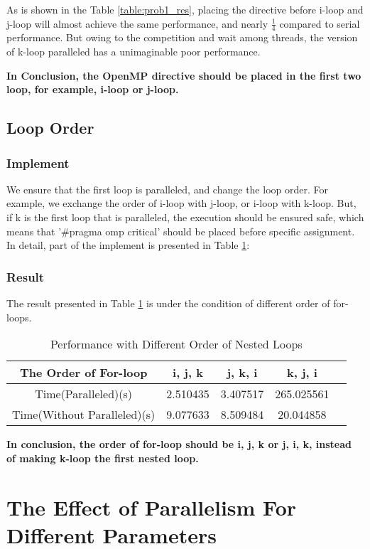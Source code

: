 \documentclass[a4paper]{article}   %
\begin{document}
\begin{CJK}{UTF8}{gbsn}
\begin{spacing}{1.2}
As is shown in the Table \ref{table:prob1_res}, placing the directive before i-loop and j-loop will almost achieve the same performance, and nearly $\frac{1}{4}$ compared to serial performance. But owing to the competition and wait among threads, the version of k-loop paralleled has a unimaginable poor performance. 

\textbf{In Conclusion, the OpenMP directive should be placed in the first two loop, for example, i-loop or j-loop.}

\subsection{Loop Order}
\subsubsection{Implement}
We ensure that the first loop is paralleled, and change the loop order. For example, we exchange the order of i-loop with j-loop, or i-loop with k-loop. But, if k is the first loop that is paralleled, the execution should be ensured safe, which means that '\#pragma omp critical' should be placed before specific assignment. In detail, part of the implement is presented in Table \ref{table:prob1_res2}:

\subsubsection{Result}
The result presented in Table \ref{table:prob1_res2} is under the condition of different order of for-loops.
\begin{table}[htbp]
\centering
\begin{tabular}{|c|c|c|c|c|}
\hline The Order of For-loop & i, j, k & j, k, i  & k, j, i \\
\hline Time(Paralleled)(s) & 2.510435 & 3.407517 & 265.025561 \\ 
\hline Time(Without Paralleled)(s) & 9.077633 & 8.509484 & 20.044858 \\
\hline 
\end{tabular}
\caption{Performance with Different Order of Nested Loops} \label{table:prob1_res2}
\end{table}

\textbf{In conclusion, the order of for-loop should be i, j, k or j, i, k, instead of making k-loop the first nested loop. }

\section{The Effect of Parallelism For Different Parameters}

\end{spacing}
\end{CJK}
\end{document}
